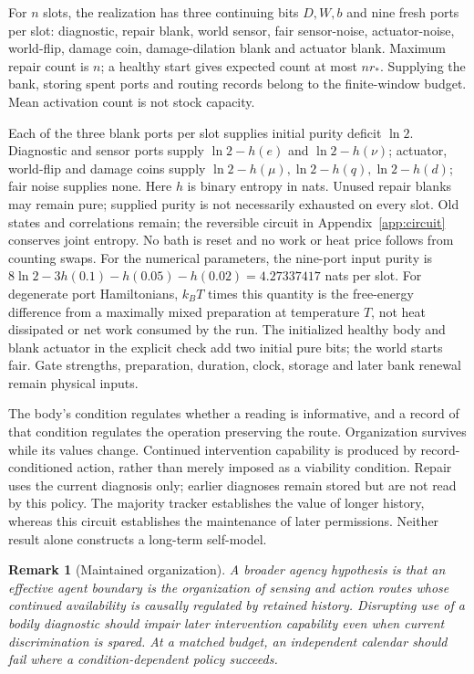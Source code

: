 \documentclass[11pt,a4paper]{article}
\newtheorem{remark}[definition]{Remark}
\begin{document}
For \(n\) slots, the realization has three continuing bits \(D,W,b\)
and nine fresh ports per slot: diagnostic, repair blank, world sensor,
fair sensor-noise, actuator-noise, world-flip, damage coin,
damage-dilation blank and actuator blank.
Maximum repair count is \(n\); a healthy start gives expected count
at most \(nr_*\). Supplying the bank, storing spent ports and routing
records belong to the finite-window budget. Mean activation count
is not stock capacity.

Each of the three blank ports per slot supplies initial purity deficit
\(\ln2\). Diagnostic and sensor ports supply \(\ln2-h(e)\) and
\(\ln2-h(\nu)\); actuator, world-flip and damage coins supply
\(\ln2-h(\mu),\ln2-h(q),\ln2-h(d)\); fair noise supplies none.
Here \(h\) is binary entropy in nats. Unused repair blanks may remain
pure; supplied purity is not necessarily exhausted on every slot.
Old states and correlations remain; the reversible circuit in
Appendix~\ref{app:circuit} conserves joint entropy.
No bath is reset and no work or heat price follows from counting swaps.
For the numerical parameters, the nine-port input purity is
\(8\ln2-3h(0.1)-h(0.05)-h(0.02)=4.27337417\) nats per slot.
For degenerate port Hamiltonians, \(k_BT\) times this quantity is the
free-energy difference from a maximally mixed preparation at temperature
\(T\), not heat dissipated or net work consumed by the run.
The initialized healthy body and blank actuator in the explicit check
add two initial pure bits; the world starts fair. Gate strengths,
preparation, duration, clock, storage and later bank renewal remain
physical inputs.

The body's condition regulates whether a reading is informative,
and a record of that condition regulates the operation preserving
the route. Organization survives while its values change.
Continued intervention capability is produced by record-conditioned
action, rather than merely imposed as a viability condition. Repair
uses the current diagnosis only; earlier diagnoses remain stored but
are not read by this policy. The majority tracker establishes the value
of longer history, whereas this circuit establishes the maintenance of
later permissions. Neither result alone constructs a long-term self-model.

\begin{remark}[Maintained organization]\label{rem:organization}
A broader agency hypothesis is that an effective agent boundary is the
organization of sensing and action routes whose continued availability
is causally regulated by retained history. Disrupting use of a bodily
diagnostic should impair later intervention capability even when current
discrimination is spared. At a matched budget, an independent calendar
should fail where a condition-dependent policy succeeds.
\end{remark}
\end{document}

